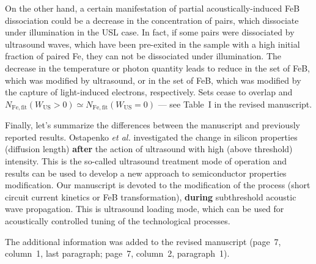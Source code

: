 \documentclass[aip,jap,preprint]{revtex4-1}
\begin{document}
On the other hand, a certain manifestation of partial acoustically-induced FeB dissociation could be
a decrease in the concentration of pairs, which dissociate under illumination in the USL case.
In fact, if some pairs were dissociated by  ultrasound waves, which have been pre-exited
in the sample with a high initial  fraction of paired Fe,
they can not be dissociated under illumination.
The decrease in the temperature   or photon quantity leads to reduce in the set of FeB, which was modified by ultrasound, or in the set of FeB, 
which was modified by the capture of light-induced electrons, respectively.
Sets cease to overlap and $N_\mathrm{Fe,fit}(W_\mathrm{US}>0)\simeq N_\mathrm{Fe,fit}(W_\mathrm{US}=0)$ --- see Table~I in the revised manuscript.


Finally, let's summarize the differences between the manuscript and previously reported results.
Ostapenko \emph{et al.}\cite{Ostapenko1995,Ostapenko1994APL,Ostapenko1995SST}
investigated the change in silicon properties (diffusion length) \textbf{after}
the action of ultrasound with high (above threshold) intensity.
This is the so-called ultrasound treatment mode of operation
and results  can be used to develop a new approach to semiconductor properties modification.
Our manuscript is devoted to the modification of the process
(short circuit current kinetics or FeB transformation),
\textbf{during} subthreshold acoustic wave propagation.
This is ultrasound loading mode,
which can be used for acoustically controlled tuning of the technological processes.

The additional information was added to the revised manuscript
(page~7, column~1, last paragraph; page~7, column~2, paragraph~1).


\end{document}
